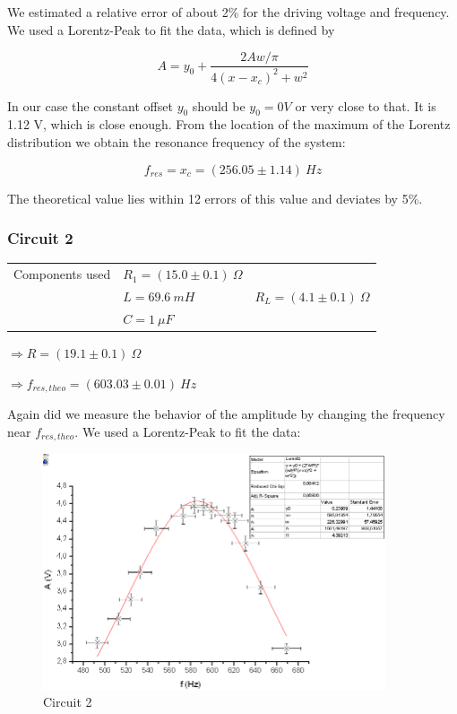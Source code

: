 We estimated a relative error of about 2\% for the driving voltage and frequency. We used a Lorentz-Peak to fit the data, which is defined by 

$$ A = y_0 + \frac{2Aw/\pi}{4(x-x_c)^2 + w^2} $$

In our case the constant offset $y_0$ should be $y_0 = 0V$ or very close to that. It is 1.12 V, which is close enough. From the location of the maximum of the Lorentz distribution we obtain the resonance frequency of the system:

$$\boxed{f_{res} = x_c = (256.05 \pm 1.14)\ Hz}$$

The theoretical value lies within 12 errors of this value and deviates by 5\%.

\subsubsection{Circuit 2}

\begin{tabular}{l l l}
Components used& $R_1 = (15.0 \pm 0.1)\ \Omega$ & \\
 & $L=69.6\ mH$ & $R_L = (4.1 \pm 0.1)\ \Omega$\\
 & $C=1\ \mu F$ & \\
\end{tabular}

$\Rightarrow R = (19.1 \pm 0.1)\ \Omega$

$\Rightarrow f_{res,theo} = (603.03 \pm 0.01)\ Hz$

Again did we measure the behavior of the amplitude by changing the frequency near $f_{res,theo}$. We used a Lorentz-Peak to fit the data: 

\begin{figure}[H]
\centering \includegraphics[width=0.9\textwidth]{Bilder/1b.png}
\caption{Circuit 2}
\end{figure}

